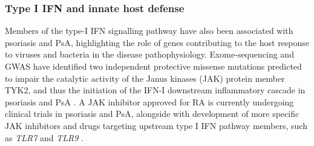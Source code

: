 \subsubsection*{Type I IFN and innate host defense}

Members of the type-I IFN signalling pathway have also been associated with psoriasis and PsA, highlighting the role of genes contributing to the host response to viruses and bacteria in the disease pathophysiology. 
Exome-sequencing and GWAS have identified two independent protective missense mutations predicted to impair the catalytic activity of the Janus kinases (JAK) protein member TYK2, and thus the initiation of the IFN-I downstream inflammatory cascade in psoriasis and PsA \parencite{Strange2010, Tsoi2012, Dand2017}. A JAK inhibitor approved for RA is currently undergoing clinical trials in psoriasis and PsA, alongside with development of more specific JAK inhibitors and drugs targeting upstream type I IFN pathway members, such as \textit{TLR7} and \textit{TLR9} \parencite{Yogo2016,Baker2017}.


